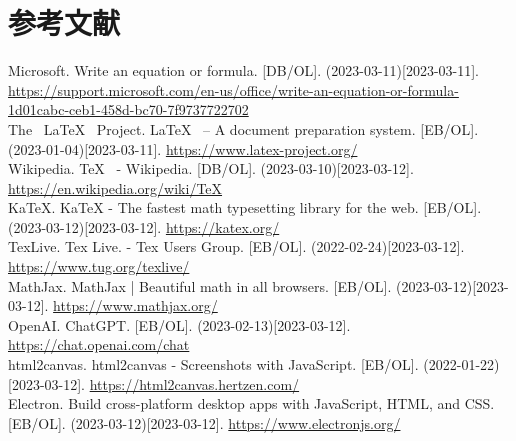 \section*{参考文献}
{}
Microsoft. Write an equation or formula. [DB/OL]. (2023-03-11)[2023-03-11].  \url{https://support.microsoft.com/en-us/office/write-an-equation-or-formula-1d01cabc-ceb1-458d-bc70-7f9737722702}
\\
The \,
\LaTeX
\, Project.
\LaTeX
\, – A document preparation system. [EB/OL]. (2023-01-04)[2023-03-11].  \url{https://www.latex-project.org/}
\\
Wikipedia.
\TeX
\,
- Wikipedia. [DB/OL]. (2023-03-10)[2023-03-12].  \url{https://en.wikipedia.org/wiki/TeX}
\\
KaTeX. KaTeX - The fastest math typesetting library for the web. [EB/OL]. (2023-03-12)[2023-03-12].  \url{https://katex.org/}
\\
TexLive. Tex Live. - Tex Users Group. [EB/OL]. (2022-02-24)[2023-03-12].  \url{https://www.tug.org/texlive/}
\\
MathJax. MathJax | Beautiful math in all browsers. [EB/OL]. (2023-03-12)[2023-03-12].  \url{https://www.mathjax.org/}
\\
OpenAI. ChatGPT. [EB/OL]. (2023-02-13)[2023-03-12].  \url{https://chat.openai.com/chat}
\\
html2canvas. html2canvas - Screenshots with JavaScript. [EB/OL]. (2022-01-22)[2023-03-12]. \url{https://html2canvas.hertzen.com/}
\\
Electron. Build cross-platform desktop apps with JavaScript, HTML, and CSS. [EB/OL].  (2023-03-12)[2023-03-12].  \url{https://www.electronjs.org/}


